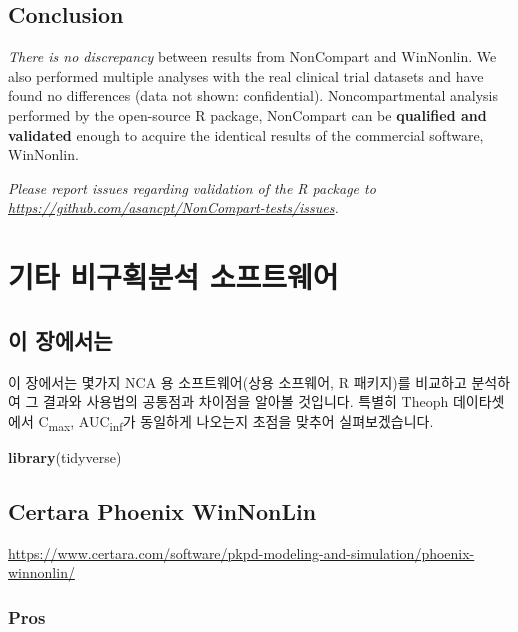 \documentclass[
  10pt,
]{krantz}
\makeatletter
\newenvironment{Shaded}{\begin{snugshade}}{\end{snugshade}}
\newcommand{\KeywordTok}[1]{\textcolor[rgb]{0.13,0.29,0.53}{\textbf{#1}}}
\newcommand{\NormalTok}[1]{#1}
\newenvironment{kframe}{%
\medskip{}
\setlength{\fboxsep}{.8em}
 \def\at@end@of@kframe{}%
 \ifinner\ifhmode%
  \def\at@end@of@kframe{\end{minipage}}%
  \begin{minipage}{\columnwidth}%
 \fi\fi%
 \def\FrameCommand##1{\hskip\@totalleftmargin \hskip-\fboxsep
 \colorbox{shadecolor}{##1}\hskip-\fboxsep
     \hskip-\linewidth \hskip-\@totalleftmargin \hskip\columnwidth}%
 \MakeFramed {\advance\hsize-\width
   \@totalleftmargin\z@ \linewidth\hsize
   \@setminipage}}%
 {\par\unskip\endMakeFramed%
 \at@end@of@kframe}
\renewenvironment{Shaded}{\begin{kframe}}{\end{kframe}}
\makeatother
\begin{document}
\hypertarget{conclusion-1}{%
\section{Conclusion}\label{conclusion-1}}

\emph{There is no discrepancy} between results from NonCompart and WinNonlin. We also performed multiple analyses with the real clinical trial datasets and have found no differences (data not shown: confidential). Noncompartmental analysis performed by the open-source R package, NonCompart can be \textbf{qualified and validated} enough to acquire the identical results of the commercial software, WinNonlin.

\emph{Please report issues regarding validation of the R package to \url{https://github.com/asancpt/NonCompart-tests/issues}.}

\hypertarget{softwares}{%
\chapter{기타 비구획분석 소프트웨어}\label{softwares}}

\hypertarget{detailschapter}{%
\section{이 장에서는}\label{detailschapter}}

이 장에서는 몇가지 NCA 용 소프트웨어(상용 소프웨어, R 패키지)를 비교하고 분석하여 그 결과와 사용법의 공통점과 차이점을 알아볼 것입니다.
특별히 Theoph 데이타셋에서 C\textsubscript{max}, AUC\textsubscript{inf}가 동일하게 나오는지 초점을 맞추어 실펴보겠습니다.

\begin{Shaded}
\begin{Highlighting}[]
\KeywordTok{library}\NormalTok{(tidyverse)}
\end{Highlighting}
\end{Shaded}

\hypertarget{certara-phoenix-winnonlin}{%
\section{Certara Phoenix WinNonLin}\label{certara-phoenix-winnonlin}}

\url{https://www.certara.com/software/pkpd-modeling-and-simulation/phoenix-winnonlin/}

\hypertarget{pros}{%
\subsection{Pros}\label{pros}}
\end{document}
